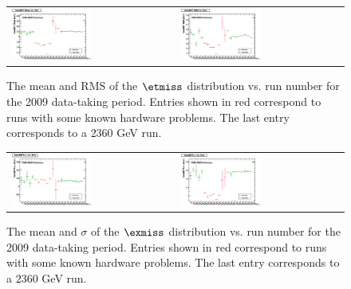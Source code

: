 \begin{figure}[h!]
 \centering
 \begin{tabular}{ll}
  \includegraphics[width=0.5\textwidth]{plots_METStability/h_calometPtMean_vs_run.eps} &
  \includegraphics[width=0.5\textwidth]{plots_METStability/h_calometPtRMS_vs_run.eps} \\
 \end{tabular}
 \caption{\small The mean and RMS of the $\etmiss$ distribution vs. run number for the 2009 data-taking period.
          Entries shown in red correspond to runs with some known hardware problems. The last entry corresponds to a $2360$ GeV run.\label{fig:MET_vs_run}}
\end{figure}

\begin{figure}[h!]
 \centering
 \begin{tabular}{ll}
  \includegraphics[width=0.5\textwidth]{plots_METStability/h_calometPxMean_vs_run.eps} &
  \includegraphics[width=0.5\textwidth]{plots_METStability/h_calometPxSigma_vs_run.eps} \\
 \end{tabular}
 \caption{\small The mean and $\sigma$ of the $\exmiss$ distribution vs. run number for the 2009 data-taking period.
          Entries shown in red correspond to runs with some known hardware problems. The last entry corresponds to a $2360$ GeV run.\label{fig:MEx_vs_run}}
\end{figure}

